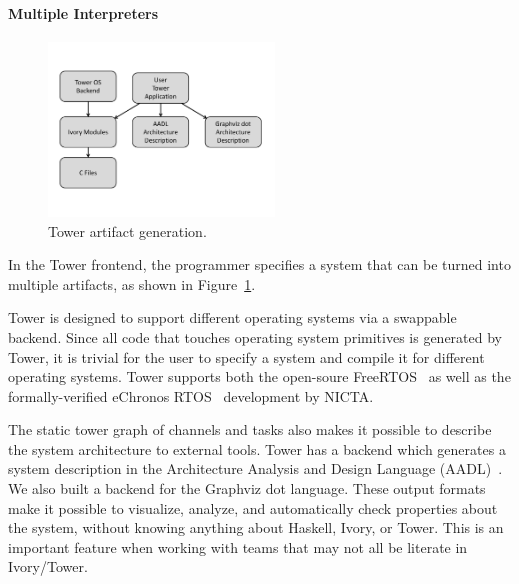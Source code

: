 \paragraph{Multiple Interpreters}
\begin{figure}
  \begin{center}
\includegraphics[width=6cm]{figures/tower-artifacts-dia}
  \end{center}
  \caption[Tower artifacts]{Tower artifact generation.}
\label{fig:towerArtifacts}
\end{figure}

In the Tower frontend, the programmer specifies a system that can be turned into
multiple artifacts, as shown in Figure~\ref{fig:towerArtifacts}.

Tower is designed to support different operating systems via a swappable
backend. Since all code that touches operating system primitives is generated by
Tower, it is trivial for the user to specify a system and compile it for
different operating systems. Tower supports both the open-soure
FreeRTOS~\cite{freertos} as well as the formally-verified eChronos
RTOS~\cite{echronos} development by NICTA.

The static tower graph of channels and tasks also makes it possible to
describe the system architecture to external tools. Tower has a backend which
generates a system description in the Architecture Analysis and Design Language
(AADL)~\cite{SAE:AADL}. We also built a backend for the Graphviz dot language.
These output formats make it possible to visualize, analyze, and automatically
check properties about the system, without knowing anything about Haskell,
Ivory, or Tower. This is an important feature when working with teams that may
not all be literate in Ivory/Tower.

